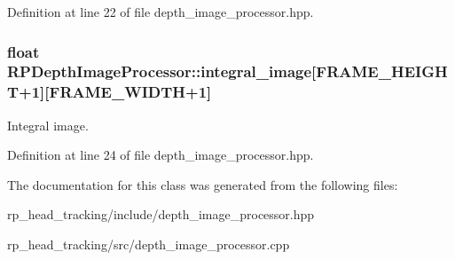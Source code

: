 \-Definition at line 22 of file depth\-\_\-image\-\_\-processor.\-hpp.

\hypertarget{class_r_p_depth_image_processor_a2b8401518c029b8485de8924ff49eb68}{
\subsubsection[{integral\-\_\-image}]{\setlength{\rightskip}{0pt plus 5cm}float {\bf \-R\-P\-Depth\-Image\-Processor\-::integral\-\_\-image}\mbox{[}\-F\-R\-A\-M\-E\-\_\-\-H\-E\-I\-G\-H\-T+1\mbox{]}\mbox{[}\-F\-R\-A\-M\-E\-\_\-\-W\-I\-D\-T\-H+1\mbox{]}}}\label{class_r_p_depth_image_processor_a2b8401518c029b8485de8924ff49eb68}
\-Integral image. 

\-Definition at line 24 of file depth\-\_\-image\-\_\-processor.\-hpp.



\-The documentation for this class was generated from the following files\-:\begin{DoxyCompactItemize}
\item 
rp\-\_\-head\-\_\-tracking/include/depth\-\_\-image\-\_\-processor.\-hpp\item 
rp\-\_\-head\-\_\-tracking/src/depth\-\_\-image\-\_\-processor.\-cpp\end{DoxyCompactItemize}
